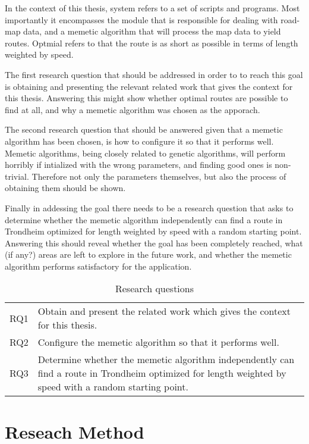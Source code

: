 In the context of this thesis, system refers to a set of scripts and programs. Most importantly it encompasses the module that is responsible for dealing with road-map data, and a memetic algorithm that will process the map data to yield routes. Optmial refers to that the route is as short as possible in terms of length weighted by speed.

The first research question that should be addressed in order to to reach this goal is obtaining and presenting the relevant related work that gives the context for this thesis. Answering this might show whether optimal routes are possible to find at all, and why a memetic algorithm was chosen as the apporach.

The second research question that should be answered given that a memetic algorithm has been chosen, is how to configure it so that it performs well. Memetic algorithms, being closely related to genetic algorithms, will perform horribly if intialized with the wrong parameters, and finding good ones is non-trivial. Therefore not only the parameters themselves, but also the process of obtaining them should be shown.

Finally in addessing the goal there needs to be a research question that asks to determine whether the memetic algorithm independently can find a route in Trondheim optimized for length weighted by speed with a random starting point. Answering this should reveal whether the goal has been completely reached, what (if any?) areas are left to explore in the future work, and whether the memetic algorithm performs satisfactory for the application.

\begin{table}[H]
\centering
\begin{tabular}{cp{}}
RQ1  &  Obtain and present the related work which gives the context for this thesis. \\
RQ2  &  Configure the memetic algorithm so that it performs well.\\
RQ3  &  Determine whether the memetic algorithm independently can find a route in Trondheim optimized for length weighted by speed with a random starting point. \\
\end{tabular}
\caption{Research questions}
\label{tab:research_questions}
\end{table}

\section{Reseach Method}

